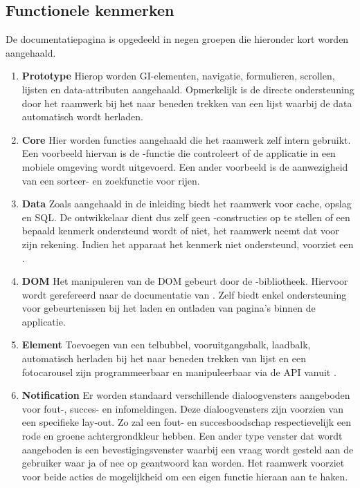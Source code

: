 \subsection{Functionele kenmerken}
De documentatiepagina is opgedeeld in negen groepen die hieronder kort worden aangehaald.

\begin{enumerate}

\item \textbf{Prototype} 
Hierop worden GI-elementen, navigatie, formulieren, scrollen, lijsten en data-attributen aangehaald. 
Opmerkelijk is de directe ondersteuning door het raamwerk bij het naar beneden trekken van een lijst waarbij de data automatisch wordt herladen.

\item \textbf{Core }
Hier worden functies aangehaald die het raamwerk zelf intern gebruikt.
Een voorbeeld hiervan is de -functie die controleert of de applicatie in een mobiele omgeving wordt uitgevoerd.
Een ander voorbeeld is de aanwezigheid van een sorteer- en zoekfunctie voor rijen.

\item \textbf{Data }
Zoals aangehaald in de inleiding biedt het raamwerk  voor cache, opslag en SQL.
De ontwikkelaar dient dus zelf geen -constructies op te stellen of een bepaald kenmerk ondersteund wordt of niet, het raamwerk neemt dat voor zijn rekening.
Indien het apparaat het kenmerk niet ondersteund, voorziet \lungo{} een .

\item \textbf{DOM }
Het manipuleren van de DOM gebeurt door de \quo{}-bibliotheek.
Hiervoor wordt gerefereerd naar de documentatie van \quo{}.
Zelf biedt \lungo{} enkel ondersteuning voor gebeurtenissen bij het laden en ontladen van pagina's binnen de applicatie.

\item \textbf{Element }
Toevoegen van een telbubbel, vooruitgangsbalk, laadbalk, automatisch herladen bij het naar beneden trekken van lijst en een fotocarousel zijn programmeerbaar en manipuleerbaar via de \lungo{} API vanuit \js{}. 

\item \textbf{Notification }
Er worden standaard verschillende dialoogvensters aangeboden voor fout-, succes- en infomeldingen.
Deze dialoogvensters zijn voorzien van een specifieke lay-out.
Zo zal een fout- en succesboodschap respectievelijk een rode en groene achtergrondkleur hebben.
Een ander type venster dat wordt aangeboden is een bevestigingsvenster waarbij een vraag wordt gesteld aan de gebruiker waar ja of nee op geantwoord kan worden.
Het raamwerk voorziet voor beide acties de mogelijkheid om een eigen functie hieraan aan te haken.
 

\end{enumerate}

